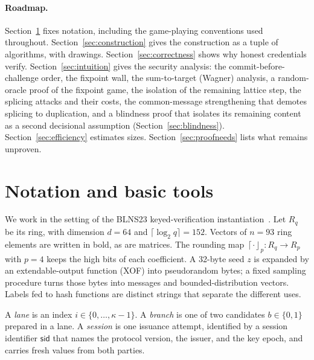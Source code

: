 \documentclass[11pt]{article}
\newcommand{\R}{R_q}
\newcommand{\roundp}[1]{\left\lceil #1\right\rfloor_p}
\begin{document}
\paragraph{Roadmap.}
Section~\ref{sec:notation} fixes notation, including the game-playing
conventions used throughout.  Section~\ref{sec:construction} gives the
construction as a tuple of algorithms, with drawings.
Section~\ref{sec:correctness} shows why honest credentials verify.
Section~\ref{sec:intuition} gives the security analysis: the
commit-before-challenge order, the fixpoint wall, the sum-to-target (Wagner)
analysis, a random-oracle proof of the fixpoint game, the isolation of the
remaining lattice step, the splicing attacks and their costs, the
common-message strengthening that demotes splicing to duplication, and a
blindness proof that isolates its remaining content as a second decisional
assumption (Section~\ref{sec:blindness}).  Section~\ref{sec:efficiency} estimates sizes.
Section~\ref{sec:proofneeds} lists what remains unproven.

\section{Notation and basic tools}
\label{sec:notation}

We work in the setting of the BLNS23 keyed-verification
instantiation~\cite{BLNS23}.  Let $\R$ be its ring, with
dimension $d=64$ and $\lceil\log_2 q\rceil=152$.  Vectors of $n=93$ ring
elements are written in bold, as are matrices.  The rounding map
$\roundp{\cdot}:\R\rightarrow R_p$ with $p=4$ keeps the high bits of each
coefficient.  A 32-byte seed $z$ is expanded by an extendable-output function
(XOF) into pseudorandom bytes; a fixed sampling procedure turns those bytes
into messages and bounded-distribution vectors.  Labels fed to hash functions
are distinct strings that separate the different uses.

A \emph{lane} is an index $i\in\{0,\ldots,\kappa-1\}$.  A \emph{branch} is one
of two candidates $b\in\{0,1\}$ prepared in a lane.  A \emph{session} is one
issuance attempt, identified by a session identifier $\mathsf{sid}$ that names
the protocol version, the issuer, and the key epoch, and carries fresh values
from both parties.
\end{document}
